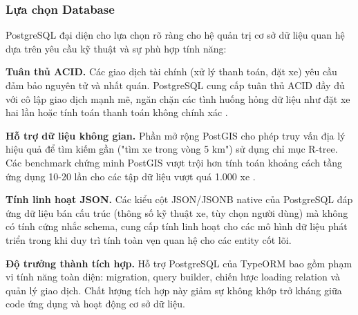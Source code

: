 \subsubsection{Lựa chọn Database}

PostgreSQL đại diện cho lựa chọn rõ ràng cho hệ quản trị cơ sở dữ liệu quan hệ dựa trên yêu cầu kỹ thuật và sự phù hợp tính năng:

\textbf{Tuân thủ ACID.} Các giao dịch tài chính (xử lý thanh toán, đặt xe) yêu cầu đảm bảo nguyên tử và nhất quán. PostgreSQL cung cấp tuân thủ ACID đầy đủ với cô lập giao dịch mạnh mẽ, ngăn chặn các tình huống hỏng dữ liệu như đặt xe hai lần hoặc tính toán thanh toán không chính xác \cite{postgresql2024}.

\textbf{Hỗ trợ dữ liệu không gian.} Phần mở rộng PostGIS cho phép truy vấn địa lý hiệu quả để tìm kiếm gần ("tìm xe trong vòng 5 km") sử dụng chỉ mục R-tree. Các benchmark chứng minh PostGIS vượt trội hơn tính toán khoảng cách tầng ứng dụng 10-20 lần cho các tập dữ liệu vượt quá 1.000 xe \cite{postgis2024}.

\textbf{Tính linh hoạt JSON.} Các kiểu cột JSON/JSONB native của PostgreSQL đáp ứng dữ liệu bán cấu trúc (thông số kỹ thuật xe, tùy chọn người dùng) mà không có tính cứng nhắc schema, cung cấp tính linh hoạt cho các mô hình dữ liệu phát triển trong khi duy trì tính toàn vẹn quan hệ cho các entity cốt lõi.

\textbf{Độ trưởng thành tích hợp.} Hỗ trợ PostgreSQL của TypeORM bao gồm phạm vi tính năng toàn diện: migration, query builder, chiến lược loading relation và quản lý giao dịch. Chất lượng tích hợp này giảm sự không khớp trở kháng giữa code ứng dụng và hoạt động cơ sở dữ liệu.